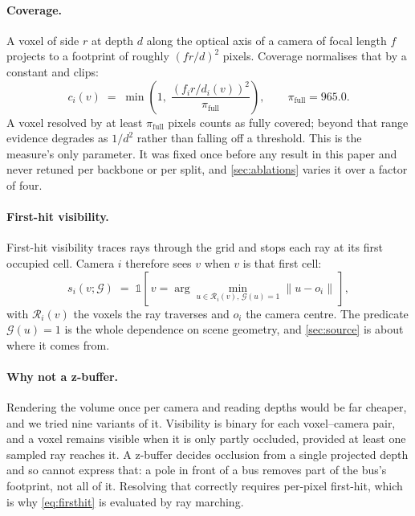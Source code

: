 \documentclass[10pt,twocolumn,letterpaper]{article}
\begin{document}
\paragraph{Coverage.}
A voxel of side $r$ at depth $d$ along the optical axis of a camera of
focal length $f$ projects to a footprint of roughly $(f r / d)^2$ pixels.
Coverage normalises that by a constant and clips:
\begin{equation}
c_i(v) \;=\; \min\!\left(1,\; \frac{(f_i r / d_i(v))^{2}}{\pi_{\text{full}}}\right),
\qquad \pi_{\text{full}} = 965.0 .
\label{eq:coverage}
\end{equation}
A voxel resolved by at least $\pi_{\text{full}}$ pixels counts as fully
covered; beyond that range evidence degrades as $1/d^2$ rather than
falling off a threshold. This is the measure's only parameter. It was
fixed once before any result in this paper and never retuned per backbone
or per split, and \cref{sec:ablations} varies it over a factor of four.

\paragraph{First-hit visibility.}
First-hit visibility traces rays through the grid and stops each ray at
its first occupied cell. Camera $i$ therefore sees $v$ when $v$ is that
first cell:
\begin{equation}
s_i(v;\mathcal{G}) \;=\; \mathbb{1}\!\left[\,v = \!\!\arg\min_{u \in \mathcal{R}_i(v),\,
   \mathcal{G}(u)=1} \!\! \lVert u - o_i \rVert \,\right],
\label{eq:firsthit}
\end{equation}
with $\mathcal{R}_i(v)$ the voxels the ray traverses and $o_i$ the camera
centre. The predicate $\mathcal{G}(u)=1$ is the whole dependence on scene
geometry, and \cref{sec:source} is about where it comes from.

\paragraph{Why not a z-buffer.}
Rendering the volume once per camera and reading depths would be far
cheaper, and we tried nine variants of it. Visibility is binary for each voxel--camera pair, and a voxel remains
visible when it is only partly occluded, provided at least one sampled ray
reaches it. A z-buffer decides occlusion from a single projected depth and
so cannot express that: a pole in front of a bus removes part of the bus's
footprint, not all of it. Resolving that
correctly requires per-pixel first-hit, which is why \cref{eq:firsthit} is
evaluated by ray marching.
\end{document}
